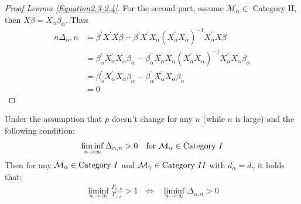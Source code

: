 \documentclass[Research_Module_ES.tex]{subfiles}
\begin{document}
\begin{proof}[Proof Lemma \ref{Equation2.3-2.4}]
	For the second part, assume $\mathcal{M}_\alpha\in$ Category II, then $X\beta=X_\alpha\beta_\alpha$. Thus
	\begin{align*}
		n\Delta_\alpha,n&=\beta^\prime X^\prime X\beta-\beta^\prime X^\prime X_\alpha \left(X_\alpha^\prime X_\alpha\right)^{-1}X_\alpha^\prime X\beta\\
		&=\beta_\alpha^\prime X_\alpha^\prime X_\alpha \beta_\alpha -\beta_\alpha^\prime X_\alpha^\prime X_\alpha\left(X_\alpha^\prime X_\alpha\right)^{-1} X_\alpha^\prime X_\alpha\beta_\alpha\\
		&=\beta_\alpha^\prime X_\alpha^\prime X_\alpha \beta_\alpha - \beta_\alpha^\prime X_\alpha^\prime X_\alpha \beta_\alpha\\
		&=0
	\end{align*}
	
\end{proof}

\begin{lemma}
	\label{Equation2.5}
	Under the assumption that $p$ doesn't change for any $n$ (while $n$ is large) and the following condition:
	\begin{align}
		\liminf_{n\rightarrow\infty}\Delta_{\alpha,n}>0 \text{~~~for~}\mathcal{M}_\alpha\in\text{Category}~\RM{1} \label{liminf_condition}
	\end{align}
	Then for any $\mathcal{M}_\alpha\in\text{Category}~\RM{1}$ and $\mathcal{M}_\gamma\in\text{Category}~\RM{2}$ with $d_\alpha=d_\gamma$ it holds that:
	\begin{align*}
		\liminf_{n\rightarrow\infty}\frac{\Gamma_{\alpha,n}}{\Gamma_{\gamma,n}}>1~~~\Leftrightarrow~~~\liminf_{n\rightarrow\infty}\Delta_{\alpha,n}>0
	\end{align*}
\end{lemma}
\end{document}

